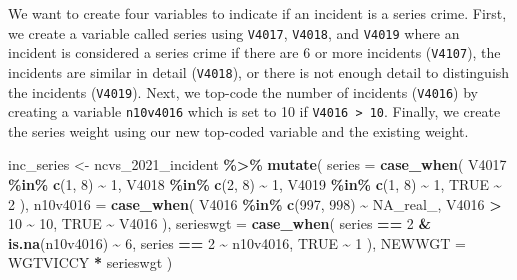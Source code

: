 \documentclass[
]{krantz}
\makeatletter
\newenvironment{Shaded}{\begin{snugshade}}{\end{snugshade}}
\newcommand{\AttributeTok}[1]{\textcolor[rgb]{0.27,0.27,0.27}{#1}}
\newcommand{\ConstantTok}[1]{\textcolor[rgb]{0.37,0.37,0.37}{#1}}
\newcommand{\DecValTok}[1]{\textcolor[rgb]{0.06,0.06,0.06}{#1}}
\newcommand{\FunctionTok}[1]{\textcolor[rgb]{0.27,0.27,0.27}{\textbf{#1}}}
\newcommand{\NormalTok}[1]{#1}
\newcommand{\OtherTok}[1]{\textcolor[rgb]{0.37,0.37,0.37}{#1}}
\newcommand{\SpecialCharTok}[1]{\textcolor[rgb]{0.43,0.43,0.43}{\textbf{#1}}}
\newenvironment{kframe}{%
\medskip{}
\setlength{\fboxsep}{.8em}
 \def\at@end@of@kframe{}%
 \ifinner\ifhmode%
  \def\at@end@of@kframe{\end{minipage}}%
  \begin{minipage}{\columnwidth}%
 \fi\fi%
 \def\FrameCommand##1{\hskip\@totalleftmargin \hskip-\fboxsep
 \colorbox{shadecolor}{##1}\hskip-\fboxsep
     \hskip-\linewidth \hskip-\@totalleftmargin \hskip\columnwidth}%
 \MakeFramed {\advance\hsize-\width
   \@totalleftmargin\z@ \linewidth\hsize
   \@setminipage}}%
 {\par\unskip\endMakeFramed%
 \at@end@of@kframe}
\renewenvironment{Shaded}{\begin{kframe}}{\end{kframe}}
\makeatother
\begin{document}
We want to create four variables to indicate if an incident is a series crime. First, we create a variable called series using \texttt{V4017}, \texttt{V4018}, and \texttt{V4019} where an incident is considered a series crime if there are 6 or more incidents (\texttt{V4107}), the incidents are similar in detail (\texttt{V4018}), or there is not enough detail to distinguish the incidents (\texttt{V4019}). Next, we top-code the number of incidents (\texttt{V4016}) by creating a variable \texttt{n10v4016} which is set to 10 if \texttt{V4016\ \textgreater{}\ 10}. Finally, we create the series weight using our new top-coded variable and the existing weight.

\begin{Shaded}
\begin{Highlighting}[]
\NormalTok{inc\_series }\OtherTok{\textless{}{-}}\NormalTok{ ncvs\_2021\_incident }\SpecialCharTok{\%\textgreater{}\%}
  \FunctionTok{mutate}\NormalTok{(}
    \AttributeTok{series =} \FunctionTok{case\_when}\NormalTok{(}
\NormalTok{      V4017 }\SpecialCharTok{\%in\%} \FunctionTok{c}\NormalTok{(}\DecValTok{1}\NormalTok{, }\DecValTok{8}\NormalTok{) }\SpecialCharTok{\textasciitilde{}} \DecValTok{1}\NormalTok{,}
\NormalTok{      V4018 }\SpecialCharTok{\%in\%} \FunctionTok{c}\NormalTok{(}\DecValTok{2}\NormalTok{, }\DecValTok{8}\NormalTok{) }\SpecialCharTok{\textasciitilde{}} \DecValTok{1}\NormalTok{,}
\NormalTok{      V4019 }\SpecialCharTok{\%in\%} \FunctionTok{c}\NormalTok{(}\DecValTok{1}\NormalTok{, }\DecValTok{8}\NormalTok{) }\SpecialCharTok{\textasciitilde{}} \DecValTok{1}\NormalTok{,}
      \ConstantTok{TRUE} \SpecialCharTok{\textasciitilde{}} \DecValTok{2}
\NormalTok{    ),}
    \AttributeTok{n10v4016 =} \FunctionTok{case\_when}\NormalTok{(}
\NormalTok{      V4016 }\SpecialCharTok{\%in\%} \FunctionTok{c}\NormalTok{(}\DecValTok{997}\NormalTok{, }\DecValTok{998}\NormalTok{) }\SpecialCharTok{\textasciitilde{}} \ConstantTok{NA\_real\_}\NormalTok{,}
\NormalTok{      V4016 }\SpecialCharTok{\textgreater{}} \DecValTok{10} \SpecialCharTok{\textasciitilde{}} \DecValTok{10}\NormalTok{,}
      \ConstantTok{TRUE} \SpecialCharTok{\textasciitilde{}}\NormalTok{ V4016}
\NormalTok{    ),}
    \AttributeTok{serieswgt =} \FunctionTok{case\_when}\NormalTok{(}
\NormalTok{      series }\SpecialCharTok{==} \DecValTok{2} \SpecialCharTok{\&} \FunctionTok{is.na}\NormalTok{(n10v4016) }\SpecialCharTok{\textasciitilde{}} \DecValTok{6}\NormalTok{,}
\NormalTok{      series }\SpecialCharTok{==} \DecValTok{2} \SpecialCharTok{\textasciitilde{}}\NormalTok{ n10v4016,}
      \ConstantTok{TRUE} \SpecialCharTok{\textasciitilde{}} \DecValTok{1}
\NormalTok{    ),}
    \AttributeTok{NEWWGT =}\NormalTok{ WGTVICCY }\SpecialCharTok{*}\NormalTok{ serieswgt}
\NormalTok{  )}
\end{Highlighting}
\end{Shaded}
\end{document}
